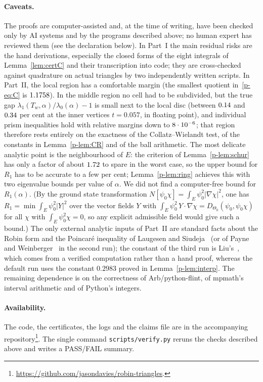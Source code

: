 \documentclass[11pt]{article}
\theoremstyle{remark}
\begin{document}
\paragraph{Caveats.} The proofs are computer-assisted and, at the time of writing, have been checked
only by AI systems and by the programs described above; no human expert has reviewed them (see the
declaration below). In Part~I the main residual risks are the hand derivations, especially the closed
forms of the eight integrals of Lemma~\ref{lem:certC} and their transcription into code; they are
cross-checked against quadrature on actual triangles by two independently written scripts. In Part~II,
the local region has a comfortable margin (the smallest quotient in~\eqref{p-eq:C} is $1.1758$). In the
middle region no cell had to be subdivided, but the true gap $\lambda_1(T_w,\alpha)/\lambda_0(\alpha)-1$
is small next to the local disc (between $0.14$ and $0.34$ per cent at the inner vertices
$t=0.057$, in floating point), and individual prism inequalities hold with relative margins down to
$8\cdot10^{-6}$; that region therefore rests entirely on the exactness of the Collatz--Wielandt test, of
the constants in Lemma~\ref{p-lem:CR} and of the ball arithmetic. The most delicate analytic point is the
neighbourhood of $E$: the criterion of Lemma~\ref{p-lem:schur} has only a factor of about $1.72$ to
spare in the worst case, so the upper bound for $R_1$ has to be accurate to a few per cent;
Lemma~\ref{p-lem:ring} achieves this with two eigenvalue bounds per value of $\alpha$. We did not find a
computer-free bound for $R_1(\alpha)$. (By the ground state transformation
$N[\psi_0\chi]=\int_E\psi_0^2|\nabla\chi|^2$, one has $R_1=\min\int_E\psi_0^2|Y|^2$ over the vector fields
$Y$ with $\int_E\psi_0^2\,Y\cdot\nabla\chi=D_{\Theta_0}(\psi_0,\psi_0\chi)$ for all $\chi$ with
$\int_E\psi_0^2\chi=0$, so any explicit admissible field would give such a bound.) The only external
analytic inputs of Part~II are standard facts about the Robin form and the Poincar\'e inequality of
Laugesen and Siudeja~\cite{LaSiPoincare} (or of Payne and Weinberger~\cite{PW} in the second run); the
constant of the third run is Liu's~\cite{Liu}, which comes from a verified computation rather than a
hand proof, whereas the default run uses the constant $0.2983$ proved in Lemma~\ref{p-lem:interp}. The
remaining dependence is on the correctness of Arb/python-flint, of mpmath's interval arithmetic and of
Python's integers.

\paragraph{Availability.} The code, the certificates, the logs and the claims file are in the
accompanying repository\footnote{\url{https://github.com/jasondavies/robin-triangles}.}. The single
command \texttt{scripts/verify.py} reruns the checks described above and writes a PASS/FAIL summary.
\end{document}
